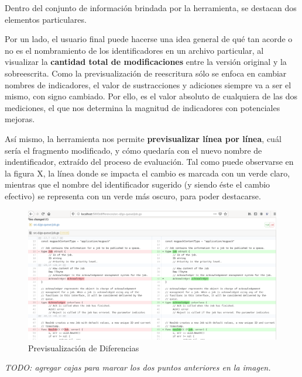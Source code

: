 Dentro del conjunto de información brindada por la herramienta, se destacan
dos elementos particulares.

Por un lado, el usuario final puede hacerse una idea general de qué tan acorde
o no es el nombramiento de los identificadores en un archivo particular, al
visualizar la \textbf{cantidad total de modificaciones} entre la versión original
y la sobreescrita.
Como la previsualización de reescritura sólo se enfoca en cambiar nombres de
indicadores, el valor de sustracciones y adiciones siempre va a ser el mismo, con
signo cambiado.
Por ello, es el valor absoluto de cualquiera de las dos mediciones, el que nos
determina la magnitud de indicadores con potenciales mejoras.

Así mismo, la herramienta nos permite \textbf{previsualizar línea por línea}, cuál sería
el fragmento modificado, y cómo quedaría con el nuevo nombre de indentificador,
extraído del proceso de evaluación.
Tal como puede observarse en la figura X, la línea donde se impacta el cambio
es marcada con un verde claro, mientras que el nombre del identificador sugerido
(y siendo éste el cambio efectivo) se representa con un verde más oscuro, para
poder destacarse.

\begin{figure}[H]
  \includegraphics[width=12cm]{implementation/diff_viewer.png}
  \centering
  \caption{Previsualización de Diferencias}
\end{figure}

\textit{TODO: agregar cajas para marcar los dos puntos anteriores en la imagen.}
